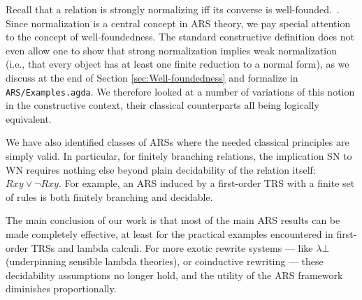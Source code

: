 Recall that a relation is strongly normalizing iff its converse is well-founded.~\cite[Def.1.1.13]{Terese}.
Since normalization is a central concept in ARS theory,
we pay special attention to the concept of well-foundedness.
The standard constructive definition does not even allow one to show that strong normalization implies weak normalization (i.e., that every object has at least one finite reduction to a normal form),
as we discuss at the end of Section \ref{sec:Well-foundedness} and formalize in \texttt{ARS/Examples.agda}. We therefore looked at a number of variations of this notion in the constructive context,
their classical counterparts all being logically equivalent. %

We have also identified classes of ARSs where the needed classical principles are simply valid.  In particular, for finitely branching relations, the implication SN to WN requires nothing else beyond plain decidability of the relation itself: $Rxy \lor \lnot Rxy$.  For example, an ARS induced by a first-order TRS with a finite set of rules is both finitely branching and decidable.

The main conclusion of our work is that most of the main ARS results can be made completely effective, at least for the practical examples encountered in first-order TRSs and lambda calculi.
For more exotic rewrite systems --- like $\lambda \bot$ (underpinning sensible lambda theories), or coinductive rewriting ---
these decidability assumptions no longer hold, and the utility of the ARS framework diminishes proportionally.

